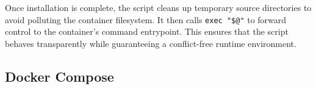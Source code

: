 Once installation is complete, the script cleans up temporary source directories to avoid polluting the container filesystem. It then calls \texttt{exec "\$@"} to forward control to the container's command entrypoint. This ensures that the script behaves transparently while guaranteeing a conflict-free runtime environment.

\vspace{1em}

\clearpage

\subsection{Docker Compose}

\begingroup
\captionsetup{type=listing}
\label{lst:docker-compose}

\par\medskip

